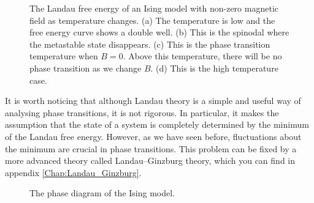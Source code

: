 \documentclass{article}
\theoremstyle{plain}\theoremheaderfont{\normalfont\bfseries}\theorembodyfont{\rmfamily}\theoremseparator{.}\newtheorem*{thm}{Theorem}\newtheorem*{law}{Law}\newtheorem*{pos}{Postulate}
\numberwithin{equation}{section}
\begin{document}
    \begin{figure}
        \centering
        \caption{The Landau free energy of an Ising model with non-zero magnetic field as temperature changes. (a) The temperature is low and the free energy curve shows a double well. (b) This is the spinodal where the metastable state disappears. (c) This is the phase transition temperature when \(B=0\). Above this temperature, there will be no phase transition as we change \(B\). (d) This is the high temperature case.}
    \end{figure}

    It is worth noticing that although Landau theory is a simple and useful way of analysing phase transitions, it is not rigorous. In particular, it makes the assumption that the state of a system is completely determined by the minimum of the Landau free energy. However, as we have seen before, fluctuations about the minimum are crucial in phase transitions. This problem can be fixed by a more advanced theory called Landau--Ginzburg theory, which you can find in appendix \cref{Chap:Landau_Ginzburg}.

    \begin{figure}
        \centering
        \caption{The phase diagram of the Ising model.}
    \end{figure}
\end{document}

